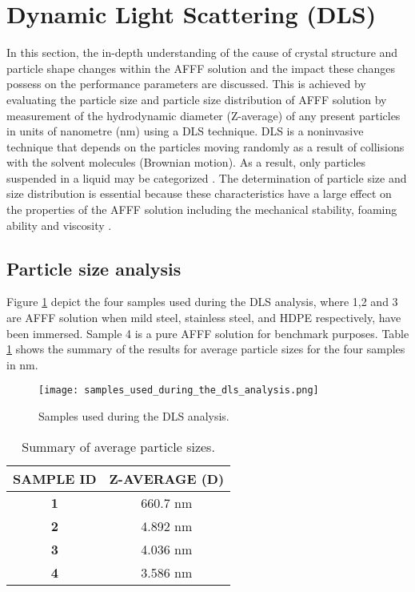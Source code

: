 \section{Dynamic Light Scattering (DLS)}
In this section, the in-depth understanding of the cause of crystal structure and particle shape changes within the AFFF solution and the impact these changes possess on the performance parameters are discussed. This is achieved by evaluating the particle size and particle size distribution of AFFF solution by measurement of the hydrodynamic diameter (Z-average) of any present particles in units of nanometre (nm) using a DLS technique. DLS is a noninvasive technique that depends on the particles moving randomly as a result of collisions with the solvent molecules (Brownian motion). As a result, only particles suspended in a liquid may be categorized \cite{mudunkotuwa2014atr}. The determination of particle size and size distribution is essential because these characteristics have a large effect on the properties of the AFFF solution including the mechanical stability, foaming ability and viscosity \cite{mohamed2017fourier}.

\subsection{Particle size analysis}
Figure \ref{ch5:figure:samples} depict the four samples used during the DLS analysis, where 1,2 and 3 are AFFF solution when mild steel, stainless steel, and HDPE respectively, have been immersed. Sample 4 is a pure AFFF solution for benchmark purposes. Table \ref{ch5:table:sizes} shows the summary of the results for average particle sizes for the four samples in nm.  
  
\begin{figure}[H]
    \texttt{[image: samples\_used\_during\_the\_dls\_analysis.png]}
    \caption{Samples used during the DLS analysis.}
    \label{ch5:figure:samples}
\end{figure}

\begin{table}[H]
\centering
\begin{tabular}{c c}
\hline
\textbf{SAMPLE ID} & \textbf{Z-AVERAGE (D)} \\
\hline
\textbf{1} & 660.7 nm \\
\textbf{2} & 4.892 nm \\
\textbf{3} & 4.036 nm \\
\textbf{4} & 3.586 nm \\
\hline
\end{tabular}

\caption{Summary of average particle sizes.}
\label{ch5:table:sizes}
\end{table}

